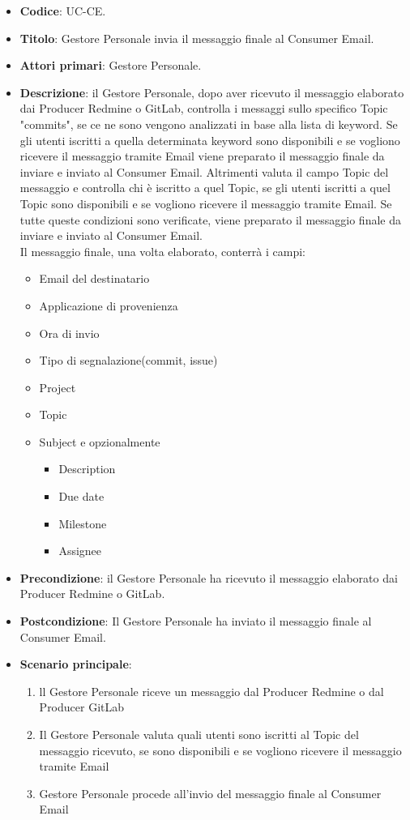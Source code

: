	\begin{itemize}
		\item \textbf{Codice}: UC\theuccount-CE.
		\item \textbf{Titolo}: Gestore Personale invia il messaggio finale al Consumer Email.
		\item \textbf{Attori primari}: Gestore Personale.
		\item \textbf{Descrizione}: il Gestore Personale, dopo aver ricevuto il messaggio elaborato dai
		Producer Redmine o GitLab, controlla i messaggi sullo specifico Topic "commits", se ce ne sono
		vengono analizzati in base alla	lista di keyword. Se gli utenti iscritti a quella determinata
		keyword sono disponibili e se vogliono ricevere il messaggio tramite Email viene preparato il
		messaggio finale da inviare e inviato al Consumer Email. Altrimenti valuta il campo Topic del
		messaggio e controlla chi è iscritto a quel Topic, se gli utenti iscritti a quel Topic sono
		disponibili e se vogliono ricevere il messaggio tramite Email. Se tutte queste condizioni sono
		verificate, viene preparato il messaggio finale da inviare e inviato al Consumer Email.\\
		Il messaggio finale, una volta elaborato, conterrà i campi:
		\begin{itemize}
			\item Email del destinatario
			\item Applicazione di provenienza
			\item Ora di invio
			\item Tipo di segnalazione(commit, issue)
			\item Project
			\item Topic
			\item Subject e opzionalmente
		 	\begin{itemize}
				\item Description
				\item Due date
				\item Milestone
				\item Assignee
			\end{itemize}
		\end{itemize}
		\item \textbf{Precondizione}: il Gestore Personale ha ricevuto il messaggio elaborato dai Producer Redmine o GitLab.
		\item \textbf{Postcondizione}: Il Gestore Personale ha inviato il messaggio finale al Consumer Email.
		\item \textbf{Scenario principale}: 
		\begin{enumerate}
			\item ll Gestore Personale riceve un messaggio dal Producer Redmine o dal Producer GitLab
			\item Il Gestore Personale valuta quali utenti sono iscritti al Topic del messaggio ricevuto, se sono disponibili e se vogliono ricevere il messaggio tramite Email
			\item Gestore Personale procede all'invio del messaggio finale al Consumer Email
		\end{enumerate}
		
	\end{itemize}